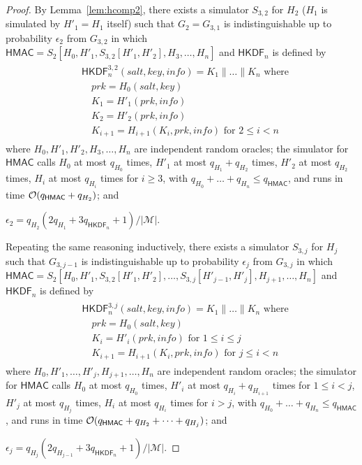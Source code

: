 \documentclass[compsoc, conference, letterpaper, 10pt, times]{IEEEtran}
\newif\ifapproxproba
\newcommand{\HKDF}{\mathsf{HKDF}}
\newcommand{\salt}{\mathit{salt}}
\newcommand{\key}{\mathit{key}}
\newcommand{\info}{\mathit{info}}
\newcommand{\prk}{\mathit{prk}}
\newcommand{\hmac}{\mathsf{HMAC}}
\newcommand{\Smac}{\mathcal{M}}
\newcommand{\ab}{\allowbreak}
\begin{document}
\begin{proof}
By Lemma~\ref{lem:hcomp2}, there exists a simulator $S_{3,2}$ for $H_2$
($H_1$ is simulated by $H'_1 = H_1$ itself)
such that $G_2 = G_{3,1}$ is
indistinguishable up to probability $\epsilon_2$ from $G_{3,2}$ in which
$\hmac = S_2[H_0, \ab H'_1, \ab S_{3,2}[H'_1, H'_2], \ab H_3, \ab \ldots, \ab H_n]$ and $\HKDF_n$ is defined by
\begin{align*}
\begin{split}
&\HKDF^{3,2}_n(\salt,\key,\info) = K_1 \| \dots \| K_n \text{ where}\\
&\quad \prk = H_0(\salt,\key)\\
&\quad K_1 = H'_1(\prk, \info )\\
&\quad K_2 = H'_2(\prk, \info )\\
&\quad K_{i+1} = H_{i+1}(K_i, \prk, \info) \text{ for }2 \leq i < n
\end{split}
\end{align*}
where $H_0, H'_1, H'_2, H_3, \dots, H_n$ are independent random oracles;
the simulator for $\hmac$ calls 
$H_0$ at most $q_{H_0}$ times,
$H'_1$ at most $q_{H_1} + q_{H_2}$ times,
$H'_2$ at most $q_{H_2}$ times,
$H_i$ at most $q_{H_i}$ times for $i \geq 3$, with
$q_{H_0} + \dots + q_{H_n} \leq q_{\hmac}$, and runs in time 
${\cal O}(q_{\hmac} + q_{H_2})$; and
\ifapproxproba
$\epsilon_2 = {\cal O}(q_{H_2}(q_{H_1} + 2 q_{\HKDF_n})/|\Smac|)$.
\else
$\epsilon_2 = q_{H_2}(2q_{H_1} + 3 q_{\HKDF_n} + 1)/|\Smac|$.
\fi

Repeating the same reasoning inductively, there exists a simulator $S_{3,j}$ 
for $H_j$ such that $G_{3,j-1}$ is
indistinguishable up to probability $\epsilon_{j}$ from $G_{3,j}$ in which
$\hmac = S_2[H_0, \ab H'_1, \ab S_{3,2}[H'_1, H'_2], \ab \dots, \ab S_{3,j}[H'_{j-1}, H'_{j}], \ab H_{j+1}, \ab \ldots, \ab H_n]$ and $\HKDF_n$ is defined by
\begin{align*}
\begin{split}
&\HKDF^{3,j}_n(\salt,\key,\info) = K_1 \| \dots \| K_n \text{ where}\\
&\quad \prk = H_0(\salt,\key)\\
&\quad K_i = H'_i(\prk, \info )\text{ for }1 \leq i \leq j\\
&\quad K_{i+1} = H_{i+1}(K_i, \prk, \info) \text{ for }j \leq i < n
\end{split}
\end{align*}
where $H_0, H'_1, \dots, H'_{j}, H_{j+1}, \dots, H_n$ are independent random oracles;
the simulator for $\hmac$ calls 
$H_0$ at most $q_{H_0}$ times,
$H'_i$ at most $q_{H_i} + q_{H_{i+1}}$ times for $1 \leq i < j$,
$H'_{j}$ at most $q_{H_{j}}$ times,
$H_i$ at most $q_{H_i}$ times for $i > j$, with
$q_{H_0} + \dots + q_{H_n} \leq q_{\hmac}$, and runs in time 
${\cal O}(q_{\hmac} + q_{H_2} + \dots + q_{H_{j}})$; and
\ifapproxproba
$\epsilon_{j} = {\cal O}(q_{H_{j}}(q_{H_{j-1}} + 2 q_{\HKDF_n})/|\Smac|)$.
\else
$\epsilon_{j} = q_{H_{j}}(2q_{H_{j-1}} + 3q_{\HKDF_n}+1)/|\Smac|$.
\fi


\end{proof}
\end{document}
